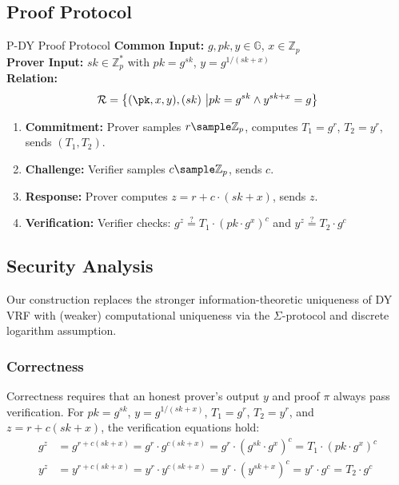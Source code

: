 \subsection{Proof Protocol}
\begin{protocol}{P-DY Proof Protocol}{}\label{protocol-pdy-protocol1}
\textbf{Common Input:} $g, pk, y \in \mathbb{G}$, $x \in \mathbb{Z}_p$ \\
\textbf{Prover Input:} $sk \in \mathbb{Z}_p^*$ with $pk = g^{sk}$, $y = g^{1/(sk + x)}$ \\
\textbf{Relation: }
\[
\mathcal{R} = \left\{ (\pk, x, y), (sk) \ \middle| pk = g^{sk} \land y^{sk + x} = g \right\}
\]
\begin{enumerate}
    \item \textbf{Commitment:} Prover samples $r \sample  \mathbb{Z}_p$, computes $T_1 = g^r$, $T_2 = y^r$, sends $(T_1, T_2)$.
    \item \textbf{Challenge:} Verifier samples $c \sample  \mathbb{Z}_p$, sends $c$.
    \item \textbf{Response:} Prover computes $z = r + c \cdot (sk + x)$, sends $z$.
    \item \textbf{Verification:} Verifier checks: $g^z \stackrel{?}{=} T_1 \cdot (pk \cdot g^x)^c$ and $y^z \stackrel{?}{=} T_2 \cdot g^c$
\end{enumerate}
\end{protocol}

\subsection{Security Analysis}

Our construction replaces the stronger information-theoretic uniqueness of DY VRF with (weaker) computational uniqueness via the $\Sigma$-protocol and discrete logarithm assumption.


\subsubsection{Correctness}

Correctness requires that an honest prover’s output $y$ and proof $\pi$ always pass verification. For $pk = g^{sk}$, $y = g^{1/(sk + x)}$, $T_1 = g^r$, $T_2 = y^r$, and $z = r + c(sk + x)$, the verification equations hold:
\begin{align*}
g^z &= g^{r + c(sk + x)} = g^r \cdot g^{c(sk + x)} = g^r \cdot (g^{sk} \cdot g^x)^c = T_1 \cdot (pk \cdot g^x)^c \\
y^z &= y^{r + c(sk + x)} = y^r \cdot y^{c(sk + x)} = y^r \cdot (y^{sk + x})^c = y^r \cdot g^c = T_2 \cdot g^c
\end{align*}

